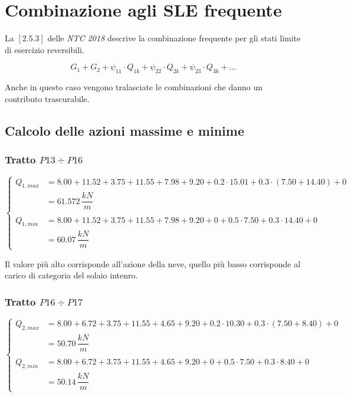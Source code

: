 \section{Combinazione agli SLE frequente}
La $[2.5.3]$ delle \emph{NTC 2018} descrive la combinazione frequente per gli stati limite di esercizio reversibili.

\[
	G_1 + G_2 + \psi_{11}\cdot Q_{1k} + \psi_{22}\cdot Q_{2k} + \psi_{23}\cdot Q_{3k} + \dots
\]

Anche in questo caso vengono tralasciate le combinazioni che danno un contributo trascurabile.

\subsection{Calcolo delle azioni massime e minime}

\subsubsection*{Tratto $P13\div P16$}
\begin{equation*}
	\begin{cases}
		Q_{1,max} &= 8.00+11.52+3.75 + 11.55+7.98+9.20 + 0.2\cdot15.01 + 0.3\cdot(7.50+14.40) +0\\
		&= 61.572\,\dfrac{kN}{m}\\\\
		Q_{1,min} &= 8.00+11.52+3.75 + 11.55+7.98+9.20+0 + 0.5\cdot 7.50 + 0.3\cdot 14.40 +0\\
		&= 60.07\,\dfrac{kN}{m}
	\end{cases}
\end{equation*}

Il valore più alto corrisponde all'azione della neve, quello più basso corrisponde al carico di categoria del solaio intenro.

\subsubsection*{Tratto $P16\div P17$}
\begin{equation*}
	\begin{cases}
		Q_{2,max} &= 8.00+6.72+3.75 + 11.55+4.65+9.20 + 0.2\cdot10.30 + 0.3\cdot(7.50+8.40) + 0\\
		&= 50.70\,\dfrac{kN}{m}\\\\
		Q_{2,min} &= 8.00+6.72+3.75 + 11.55+4.65+9.20 +0+0.5\cdot 7.50 + 0.3\cdot 8.40+0\\
		&= 50.14\,\dfrac{kN}{m}
	\end{cases}
\end{equation*}

